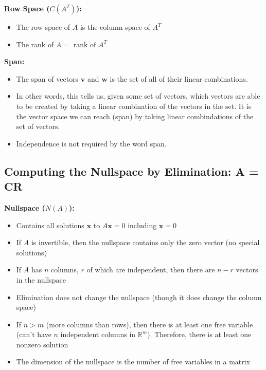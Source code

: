 \documentclass[11pt]{article}
\begin{document}
\textbf{Row Space ($C(A^T)$):}
\begin{itemize}
    \item The row space of $A$ is the column space of $A^T$
    \item The rank of $A = \text{ rank of } A^T$
\end{itemize}

\textbf{Span:} 
\begin{itemize}
    \item The span of vectors $\boldsymbol{v}$ and $\boldsymbol{w}$ is the set of all of their 
    linear combinations.
    \item In other words, this tells us, given some set of vectors, which vectors are able to 
    be created by taking a linear combination of the vectors in the set. It is the vector  
    space we can reach (span) by taking linear combindations of the set of vectors.
    \item Independence is not required by the word span.
\end{itemize}

\subsection{Computing the Nullspace by Elimination: A = CR}

\textbf{Nullspace ($N(A)$):}
\begin{itemize}
    \item Contains all solutions $\boldsymbol{x}$ to $A\boldsymbol{x} = 0$ including 
    $\boldsymbol{x} = 0$
    \item If $A$ is invertible, then the nullspace contains only the zero vector (no special
    solutions)
    \item If $A$ has $n$ columns, $r$ of which are independent, then there are $n-r$ vectors in
    the nullspace
    \item Elimination does not change the nullspace (though it does change the column space)
    \item If $n > m$ (more columns than rows), then there is at least one free variable (can't
    have $n$ independent columns in $\mathbb{R}^m$). Therefore, there is at least one nonzero 
    solution
    \item The dimension of the nullspace is the number of free variables in a matrix
\end{itemize}
\end{document}
